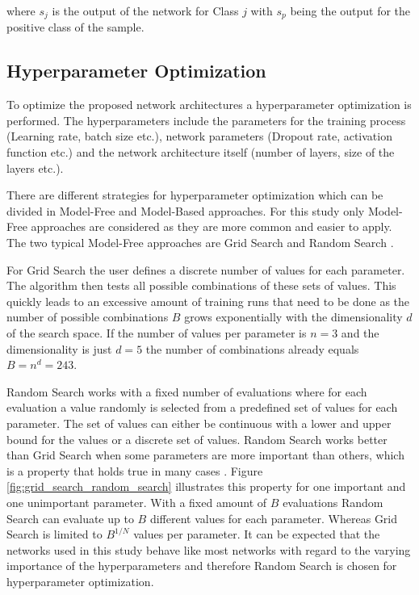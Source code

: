 \documentclass[conference]{IEEEtran}
\begin{document}
where $ s_j $ is the output of the network for Class $ j $ with $ s_p $ being the output for the positive class of the sample.

\subsection{Hyperparameter Optimization}
\label{sec:hyperparameter_optimization_method}

To optimize the proposed network architectures a hyperparameter optimization is performed. The hyperparameters include the parameters for the training process (Learning rate, batch size etc.), network parameters (Dropout rate, activation function etc.) and the network architecture itself (number of layers, size of the layers etc.).

There are different strategies for hyperparameter optimization which can be divided in Model-Free and Model-Based approaches. For this study only Model-Free approaches are considered as they are more common and easier to apply. The two typical Model-Free approaches are Grid Search and Random Search \cite{Feurer2019}. 

For Grid Search the user defines a discrete number of values for each parameter. The algorithm then tests all possible combinations of these sets of values. This quickly leads to an excessive amount of training runs that need to be done as the number of possible combinations $ B $ grows exponentially with the dimensionality $ d $ of the search space. If the number of values per parameter is $ n = 3 $ and the dimensionality is just $ d = 5 $ the number of combinations already equals $ B = n^d = 243 $.

Random Search works with a fixed number of evaluations where for each evaluation a value randomly is selected from a predefined set of values for each parameter. The set of values can either be continuous with a lower and upper bound for the values or a discrete set of values. Random Search works better than Grid Search when some parameters are more important than others, which is a property that holds true in many cases \cite{Feurer2019}. Figure \ref{fig:grid_search_random_search} illustrates this property for one important and one unimportant parameter. With a fixed amount of $ B $ evaluations Random Search can evaluate up to $ B $ different values for each parameter. Whereas Grid Search is limited to $ B^{1/N} $ values per parameter. It can be expected that the networks used in this study behave like most networks with regard to the varying importance of the hyperparameters and therefore Random Search is chosen for hyperparameter optimization.
\end{document}
